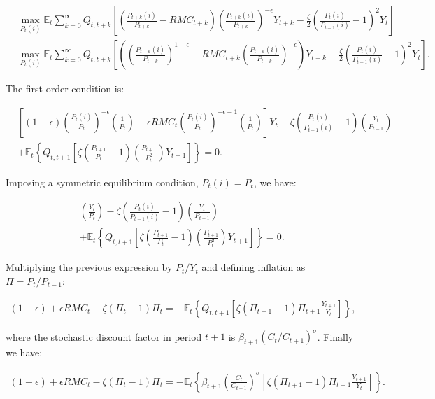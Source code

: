 \documentclass[12pt]{article}
\numberwithin{equation}{section}
\begin{document}
\begin{align*}
&\max_{P_t(i)} \mathbb{E}_t \sum_{k=0}^{\infty}Q_{t,t+k}\left[\left(\frac{P_{t+k}(i)}{P_{t+k}} - RMC_{t+k} \right)\left(\frac{P_{t+k}(i)}{P_{t+k}}\right)^{-\epsilon}Y_{t+k} - \frac{\zeta}{2}\left(\frac{P_t(i)}{P_{t-1}(i)}-1\right)^2Y_t\right]\\
&\max_{P_t(i)} \mathbb{E}_t \sum_{k=0}^{\infty}Q_{t,t+k}\left[\left(\left(\frac{P_{t+k}(i)}{P_{t+k}}\right)^{1-\epsilon} - RMC_{t+k}\left(\frac{P_{t+k}(i)}{P_{t+k}}\right)^{-\epsilon} \right)Y_{t+k} - \frac{\zeta}{2}\left(\frac{P_t(i)}{P_{t-1}(i)}-1\right)^2Y_t\right].
\end{align*}

The first order condition is:

\begin{align*}
&\left[(1-\epsilon)\left(\frac{P_{t}(i)}{P_{t}}\right)^{-\epsilon}\left(\frac{1}{P_t}\right)+\epsilon RMC_t \left(\frac{P_{t}(i)}{P_{t}}\right)^{-\epsilon-1}\left(\frac{1}{P_t}\right)\right]Y_t-\zeta\left(\frac{P_t(i)}{P_{t-1}(i)}-1\right)\left(\frac{Y_t}{P_{t-1}}\right)\\
&+\mathbb{E}_t\left\{Q_{t,t+1}\left[\zeta\left(\frac{P_{t+1}}{P_t}-1\right)\left(\frac{P_{t+1}}{P_t^2}\right)Y_{t+1}\right]\right\}=0.
\end{align*}

Imposing a symmetric equilibrium condition, $P_t(i)=P_t$, we have:

\begin{align*}
[(1-\epsilon)+\epsilon RMC_t]\left(\frac{Y_t}{P_t}\right)-\zeta\left(\frac{P_t(i)}{P_{t-1}(i)}-1\right)\left(\frac{Y_t}{P_{t-1}}\right)\\
+\mathbb{E}_t\left\{Q_{t,t+1}\left[\zeta\left(\frac{P_{t+1}}{P_t}-1\right)\left(\frac{P_{t+1}}{P_t^2}\right)Y_{t+1}\right]\right\}=0.
\end{align*}

Multiplying the previous expression by $P_t/Y_t$ and defining inflation as $\Pi=P_t/P_{t-1}$:

\begin{align*}
(1-\epsilon)+\epsilon RMC_t-\zeta(\Pi_t-1)\Pi_t=-\mathbb{E}_t\left\{Q_{t,t+1}\left[\zeta(\Pi_{t+1}-1)\Pi_{t+1}\frac{Y_{t+1}}{Y_t}\right]\right\},
\end{align*}

\noindent where the stochastic discount factor in period $t+1$ is $\beta_{t+1}(C_t/C_{t+1})^{\sigma}$. Finally we have:

\begin{align*}
(1-\epsilon)+\epsilon RMC_t-\zeta(\Pi_t-1)\Pi_t=-\mathbb{E}_t\left\{\beta_{t+1}\left(\frac{C_t}{C_{t+1}}\right)^{\sigma}\left[\zeta(\Pi_{t+1}-1)\Pi_{t+1}\frac{Y_{t+1}}{Y_t}\right]\right\}.
\end{align*}
\end{document}
